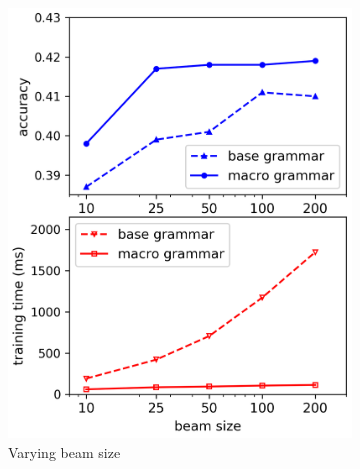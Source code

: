 \begin{figure}[t]
\begin{subfigure}[b]{0.333\textwidth}\centering
\includegraphics[width=1.0\linewidth]{figures/wtq/beamsize_split_high.png}
\caption{Varying beam size}
\label{fig:macro-hyperparam-a}
\end{subfigure}%
\begin{subfigure}[b]{0.333\textwidth}\centering

\end{subfigure}
\end{figure}
